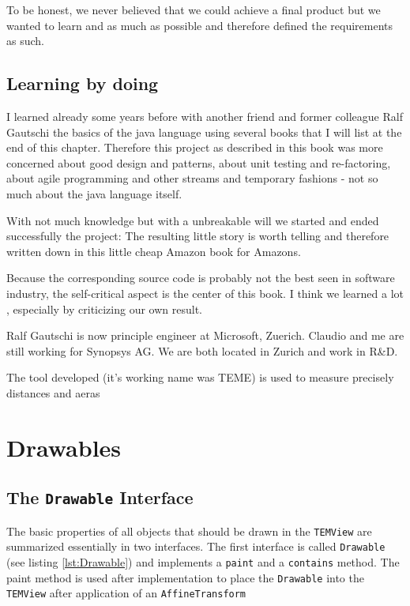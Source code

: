 \documentclass[a4paper]{book}
\begin{document}
To be honest, we never believed that we could achieve a final product but we wanted to learn and as much as possible and therefore defined the requirements as such. 

\section{Learning by doing}

I learned already some years before with another friend and former colleague Ralf Gautschi the basics of the java language using several books that I will list at the end of this chapter. Therefore this project as described in this book was more concerned about good design and patterns, about unit testing and re-factoring, about agile programming and other streams and temporary fashions - not so much about the java language itself. 

With not much knowledge but with a unbreakable will we started and ended successfully the project: 
The resulting little story is worth telling and therefore written down in this little cheap Amazon book for Amazons.

Because the corresponding source code is probably not the best seen in software 
industry,  the self-critical aspect is the center of this book. I think we learned a lot
, especially by criticizing our own result.

Ralf Gautschi is now principle engineer at Microsoft, Zuerich. Claudio and me are still 
working for Synopsys AG. We are both located in Zurich and work in R\&D. 
   
   
The tool developed (it's working name was TEME) is used to measure precisely distances and aeras   
   
\chapter{Drawables}

\section{The \texttt{Drawable} Interface}

The basic properties of all objects that should be drawn in the \texttt{TEMView} are summarized essentially in two
interfaces. The first interface is called \texttt{Drawable} (see listing \ref{lst:Drawable}) and implements a
\texttt{paint} and a \texttt{contains} method.
The paint method is used after implementation to place the \texttt{Drawable} into the \texttt{TEMView}
after application of an \texttt{AffineTransform}
\end{document}

